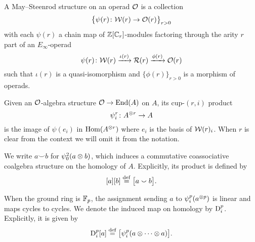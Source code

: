 \sssec

A May--Steenrod structure on an operad $\cO$ is a collection
\[
\set[\big]{\psi(r) \colon \cW(r) \to \cO(r)}_{r>0}
\]
with each $\psi(r)$ a chain map of $\Z[\cyc_r]$-modules factoring through the arity $r$ part of an $E_\infty$-operad
\[
\psi(r) \colon \cW(r) \xra{\iota(r)} \cR(r) \xra{\phi(r)} \cO(r)
\]
such that $\iota(r)$ is a quasi-isomorphism and $\{\phi(r)\}_{r>0}$ is a morphism of operads.

\sssec

Given an $\cO$-algebra structure $\cO \to \End(A)$ on $A$, its cup-$(r,i)$ product
\[
\psi_i^r \colon A^{\ot r} \to A
\]
is the image of $\psi(e_i)$ in $\Hom(A^{\ot r})$ where $e_i$ is the basis of $\cW(r)_i$.
When $r$ is clear from the context we will omit it from the notation.

We write $a \smallsmile b$ for $\psi_0^2(a \ot b)$, which induces a commutative coassociative coalgebra structure on the homology of $A$.
Explicitly, its product is defined by
\[
[a][b] \defeq \big[a \smallsmile b\big].
\]

\sssec

When the ground ring is $\Fp$, the assignment sending $a$ to $\psi_i^p(a^{\ot p})$ is linear and maps cycles to cycles.
We denote the induced map on homology by $\rD_i^p$.
Explicitly, it is given by
\[
\rD_i^p[a] \defeq \big[\psi_i^p(a \ot\dotsb\ot a)\big].
\]

